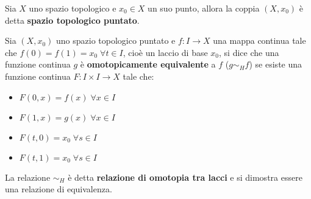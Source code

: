\begin{definition}
  Sia $ X $ uno spazio topologico e $ x_0 \in X $ un suo punto, allora la coppia $ (X, x_0) $ è detta \textbf{spazio topologico puntato}.
\end{definition}

\begin{definition}
  Sia $ (X, x_0) $ uno spazio topologico puntato e $ f: I \to X $ una mappa continua tale che $ f(0) = f(1) = x_0 \; \forall t \in I $,
  cioè un laccio di base $ x_0 $,
  si dice che una funzione continua $ g $ è \textbf{omotopicamente equivalente} a $ f $ ($ g \sim_H f $) se esiste una funzione
  continua $ F \colon I \times I \to X $ tale che:
  \begin{itemize}
  \item $ F(0,x) = f(x) \; \forall x \in I $
  \item $ F(1,x) = g(x) \; \forall x \in I $
  \item $ F(t,0) = x_0 \; \forall s \in I $
  \item $ F(t,1) = x_0 \; \forall s \in I $
  \end{itemize}
  La relazione $ \sim_H $ è detta \textbf{relazione di omotopia tra lacci} 
  e si dimostra essere una relazione di equivalenza.
\end{definition}

